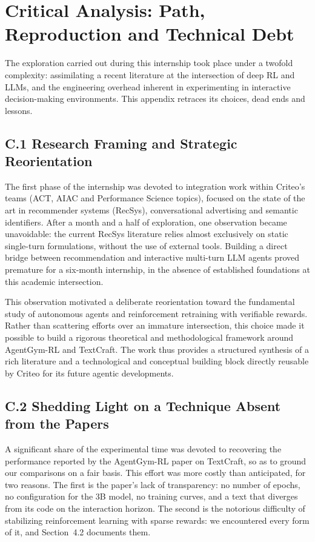 \documentclass[11pt,a4paper]{article}
\begin{document}
\newpage
\section{Critical Analysis: Path, Reproduction and Technical Debt}
\label{sec:annexe_critique}

The exploration carried out during this internship took place under a twofold complexity: assimilating a recent literature at the intersection of deep RL and LLMs, and the engineering overhead inherent in experimenting in interactive decision-making environments. This appendix retraces its choices, dead ends and lessons.

\subsection*{C.1 Research Framing and Strategic Reorientation}
The first phase of the internship was devoted to integration work within Criteo's teams (ACT, AIAC and Performance Science topics), focused on the state of the art in recommender systems (RecSys), conversational advertising and semantic identifiers. After a month and a half of exploration, one observation became unavoidable: the current RecSys literature relies almost exclusively on static single-turn formulations, without the use of external tools. Building a direct bridge between recommendation and interactive multi-turn LLM agents proved premature for a six-month internship, in the absence of established foundations at this academic intersection.

This observation motivated a deliberate reorientation toward the fundamental study of autonomous agents and reinforcement retraining with verifiable rewards. Rather than scattering efforts over an immature intersection, this choice made it possible to build a rigorous theoretical and methodological framework around AgentGym-RL and TextCraft. The work thus provides a structured synthesis of a rich literature and a technological and conceptual building block directly reusable by Criteo for its future agentic developments.

\subsection*{C.2 Shedding Light on a Technique Absent from the Papers}
A significant share of the experimental time was devoted to recovering the performance reported by the AgentGym-RL paper on TextCraft, so as to ground our comparisons on a fair basis. This effort was more costly than anticipated, for two reasons. The first is the paper's lack of transparency: no number of epochs, no configuration for the 3B model, no training curves, and a text that diverges from its code on the interaction horizon. The second is the notorious difficulty of stabilizing reinforcement learning with sparse rewards: we encountered every form of it, and Section~4.2 documents them.
\end{document}
